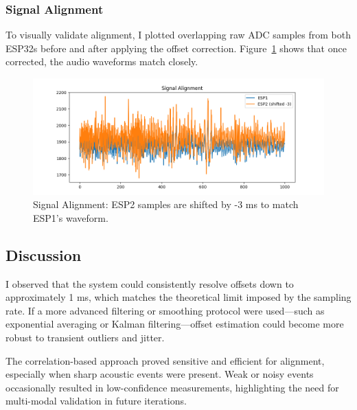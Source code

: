 \documentclass[sigconf]{acmart}
\begin{document}
\subsubsection{Signal Alignment}
To visually validate alignment, I plotted overlapping raw ADC samples from both ESP32s before and after applying the offset correction. Figure~\ref{fig:signal-alignment} shows that once corrected, the audio waveforms match closely.

\begin{figure}[H]
    \centering
    \includegraphics[width=\linewidth]{signal_alignment.png}
    \caption{Signal Alignment: ESP2 samples are shifted by -3 ms to match ESP1's waveform.}
    \label{fig:signal-alignment}
\end{figure}

\subsection{Discussion}
I observed that the system could consistently resolve offsets down to approximately 1 ms, which matches the theoretical limit imposed by the sampling rate. If a more advanced filtering or smoothing protocol were used—such as exponential averaging or Kalman filtering—offset estimation could become more robust to transient outliers and jitter.

The correlation-based approach proved sensitive and efficient for alignment, especially when sharp acoustic events were present. Weak or noisy events occasionally resulted in low-confidence measurements, highlighting the need for multi-modal validation in future iterations.
\end{document}

